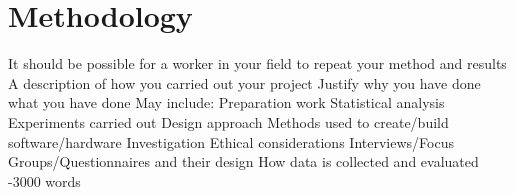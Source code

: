 \section{Methodology}

\begin{outline}
    \1 It should be possible for a worker in your field to repeat your method and results
    \1 A description of how you carried out your project
    \1 Justify why you have done what you have done
    \1 May include:
        \2 Preparation work
        \2 Statistical analysis
        \2 Experiments carried out 
        \2 Design approach
        \2 Methods used to create/build software/hardware
        \2 Investigation
        \2 Ethical considerations
        \2 Interviews/Focus Groups/Questionnaires and their design
        \2 How data is collected and evaluated
    -3000 words
\end{outline}